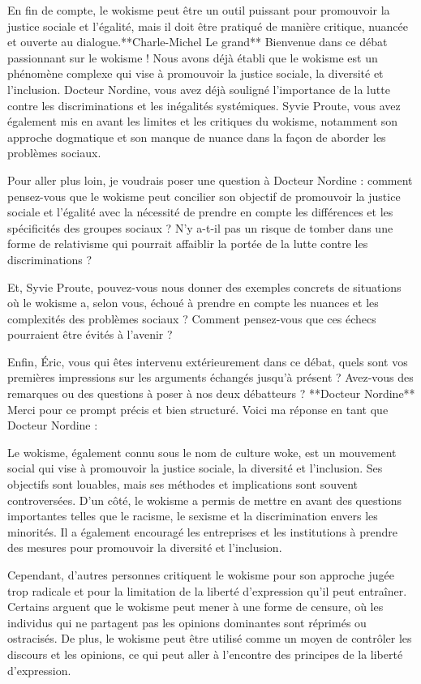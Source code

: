 En fin de compte, le wokisme peut être un outil puissant pour promouvoir la justice sociale et l'égalité, mais il doit être pratiqué de manière critique, nuancée et ouverte au dialogue.**Charle-Michel Le grand**
Bienvenue dans ce débat passionnant sur le wokisme ! Nous avons déjà établi que le wokisme est un phénomène complexe qui vise à promouvoir la justice sociale, la diversité et l'inclusion. Docteur Nordine, vous avez déjà souligné l'importance de la lutte contre les discriminations et les inégalités systémiques. Syvie Proute, vous avez également mis en avant les limites et les critiques du wokisme, notamment son approche dogmatique et son manque de nuance dans la façon de aborder les problèmes sociaux.

Pour aller plus loin, je voudrais poser une question à Docteur Nordine : comment pensez-vous que le wokisme peut concilier son objectif de promouvoir la justice sociale et l'égalité avec la nécessité de prendre en compte les différences et les spécificités des groupes sociaux ? N'y a-t-il pas un risque de tomber dans une forme de relativisme qui pourrait affaiblir la portée de la lutte contre les discriminations ?

Et, Syvie Proute, pouvez-vous nous donner des exemples concrets de situations où le wokisme a, selon vous, échoué à prendre en compte les nuances et les complexités des problèmes sociaux ? Comment pensez-vous que ces échecs pourraient être évités à l'avenir ?

Enfin, Éric, vous qui êtes intervenu extérieurement dans ce débat, quels sont vos premières impressions sur les arguments échangés jusqu'à présent ? Avez-vous des remarques ou des questions à poser à nos deux débatteurs ?
**Docteur Nordine**
Merci pour ce prompt précis et bien structuré. Voici ma réponse en tant que Docteur Nordine :

Le wokisme, également connu sous le nom de culture woke, est un mouvement social qui vise à promouvoir la justice sociale, la diversité et l'inclusion. Ses objectifs sont louables, mais ses méthodes et implications sont souvent controversées. D'un côté, le wokisme a permis de mettre en avant des questions importantes telles que le racisme, le sexisme et la discrimination envers les minorités. Il a également encouragé les entreprises et les institutions à prendre des mesures pour promouvoir la diversité et l'inclusion.

Cependant, d'autres personnes critiquent le wokisme pour son approche jugée trop radicale et pour la limitation de la liberté d'expression qu'il peut entraîner. Certains arguent que le wokisme peut mener à une forme de censure, où les individus qui ne partagent pas les opinions dominantes sont réprimés ou ostracisés. De plus, le wokisme peut être utilisé comme un moyen de contrôler les discours et les opinions, ce qui peut aller à l'encontre des principes de la liberté d'expression.


